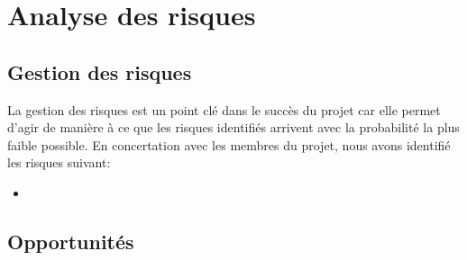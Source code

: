 \chapter*{Analyse des risques}
\label{sec:risques}
\section*{Gestion des risques}
La gestion des risques est un point clé dans le succès du projet car elle permet d'agir de manière à ce que les risques identifiés arrivent avec la probabilité la plus faible possible. En concertation avec les membres du projet, nous avons identifié les risques suivant:

\begin{itemize}
	\item
\end{itemize}

\section*{Opportunités}

